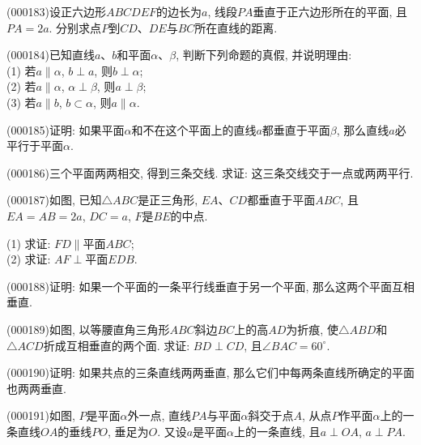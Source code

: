 \item (000183)设正六边形$ABCDEF$的边长为$a$, 线段$PA$垂直于正六边形所在的平面, 且$PA=2a$. 分别求点$P$到$CD$、$DE$与$BC$所在直线的距离.
\item (000184)已知直线$a$、$b$和平面$\alpha$、$\beta$, 判断下列命题的真假, 并说明理由:\\
(1) 若$a\parallel \alpha$, $b\perp a$, 则$b\perp \alpha$;\\
(2) 若$a\parallel \alpha$, $\alpha\perp \beta$, 则$a\perp \beta$;\\
(3) 若$a\parallel b$, $b\subset\alpha$, 则$a\parallel \alpha$.
\item (000185)证明: 如果平面$\alpha$和不在这个平面上的直线$a$都垂直于平面$\beta$, 那么直线$a$必平行于平面$\alpha$.
\item (000186)三个平面两两相交, 得到三条交线. 求证: 这三条交线交于一点或两两平行.
\item (000187)如图, 已知$\triangle ABC$是正三角形, $EA$、$CD$都垂直于平面$ABC$, 且$EA=AB=2a$, $DC=a$, $F$是$BE$的中点.
\begin{center}
\end{center}
(1) 求证: $FD\parallel \text{平面}ABC$;\\
(2) 求证: $AF\perp \text{平面}EDB$.
\item (000188)证明: 如果一个平面的一条平行线垂直于另一个平面, 那么这两个平面互相垂直.
\item (000189)如图, 以等腰直角三角形$ABC$斜边$BC$上的高$AD$为折痕, 使$\triangle ABD$和$\triangle ACD$折成互相垂直的两个面. 求证: $BD\perp CD$, 且$\angle BAC=60^\circ$.
\begin{center}
\end{center}
\item (000190)证明: 如果共点的三条直线两两垂直, 那么它们中每两条直线所确定的平面也两两垂直.
\item (000191)如图, $P$是平面$\alpha$外一点, 直线$PA$与平面$\alpha$斜交于点$A$, 从点$P$作平面$\alpha$上的一条直线$OA$的垂线$PO$, 垂足为$O$. 又设$a$是平面$\alpha$上的一条直线, 且$a\perp OA$, $a\perp PA$.

